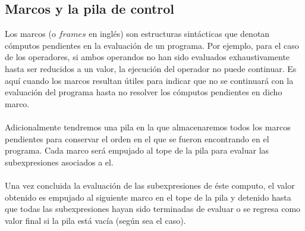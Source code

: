  \subsection{Marcos y la pila de control}
  Los marcos (o $frames$ en inglés) son estructuras sintácticas que denotan cómputos pendientes en la evaluación de un programa. Por ejemplo, para el caso de los operadores, si ambos operandos no han sido evaluados exhaustivamente hasta ser reducidos a un valor, la ejecución del operador no puede continuar.
 Es aquí cuando los marcos resultan útiles para indicar que no se continuará con la evaluación del programa hasta no resolver los cómputos pendientes en dicho marco.\\\\
Adicionalmente tendremos una pila en la que almacenaremos todos los marcos pendientes para conservar el orden en el que se fueron encontrando en el programa.  Cada marco será empujado al tope de la pila para evaluar las subexpresiones asociados a el. \\\\
Una vez concluida la evaluación de las subexpresiones de éste computo, el valor obtenido es empujado al siguiente marco en el tope de la pila y detenido hasta que todas las subexpresiones hayan sido terminadas de evaluar o se regresa como valor final si la pila está vacía (según sea el caso). \\\\
